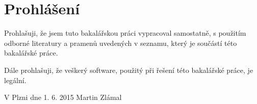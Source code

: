 \chapter*{Prohlášení}
Prohlašuji, že jsem tuto bakalářskou práci vypracoval samostatně, s použitím odborné literatury a pramenů uvedených v seznamu, který je součástí této bakalářské práce.

Dále prohlašuji, že veškerý software, použitý při řešení této bakalářské práce, je legální.

\hfill \namesig

\vfill
V Plzni dne 1. 6. 2015
\hfill Martin Zlámal


